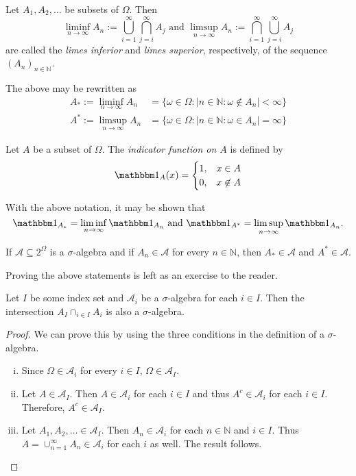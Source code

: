 \begin{definition}
\label{defLimes}
    Let $A_1,A_2,\ldots$ be subsets of $\Omega$. Then
    $$\liminf_{n\to\infty}A_n:=\bigcup_{i=1}^\infty\bigcap_{j=i}^\infty A_j\text{ and }\limsup_{n\to\infty}A_n:=\bigcap_{i=1}^\infty\bigcup_{j=i}^\infty A_j$$
    are called the \textit{limes inferior} and \textit{limes superior}, respectively, of the sequence $(A_n)_{n\in\mathbb{N}}$.
\end{definition}

The above may be rewritten as
\begin{align*}
    A_*:=\liminf_{n\to\infty}A_n &= \{\omega\in\Omega : |n\in\mathbb{N}:\omega\not\in A_n|<\infty\} \\
    A^*:=\limsup_{n\to\infty}A_n &= \{\omega\in\Omega : |n\in\mathbb{N}:\omega\in A_n|=\infty\}
\end{align*}

\begin{definition}
    Let $A$ be a subset of $\Omega$. The \textit{indicator function on $A$} is defined by
    $$\indic_A(x)
    =
    \begin{cases}
    1, & x\in A \\
    0, & x\not\in A
    \end{cases}
    $$
\end{definition}

With the above notation, it may be shown that
$$\indic_{A_*}=\liminf_{n\to\infty}\indic_{A_n}\text{ and }\indic_{A^*}=\limsup_{n\to\infty}\indic_{A_n}.$$

If $\mathcal{A}\subseteq2^\Omega$ is a $\sigma$-algebra and if $A_n\in\mathcal{A}$ for every $n\in\mathbb{N}$, then $A_*\in\mathcal{A}$ and $A^*\in\mathcal{A}$.

Proving the above statements is left as an exercise to the reader.

\begin{theorem}
\label{capofSigmaAisSigmaA}
    Let $I$ be some index set and $\mathcal{A}_i$ be a $\sigma$-algebra for each $i\in I$. Then the intersection $A_I\displaystyle\cap_{i\in I}A_i$ is also a $\sigma$-algebra.
\end{theorem}
\begin{proof}
    We can prove this by using the three conditions in the definition of a $\sigma$-algebra.
    \begin{enumerate}[(i)]
        \item Since $\Omega\in \mathcal{A}_i$ for every $i\in I$, $\Omega\in \mathcal{A}_I$.
        \item Let $A\in \mathcal{A}_I$. Then $A\in \mathcal{A}_i$ for each $i\in I$ and thus $A^c\in \mathcal{A}_i$ for each $i\in I$. Therefore, $A^c\in \mathcal{A}_I$.
        \item Let $A_1,A_2,\ldots\in \mathcal{A}_I$. Then $A_n\in\mathcal{A}_i$ for each $n\in\mathbb{N}$ and $i\in I$. Thus $A=\cup_{n=1}^\infty A_n\in\mathcal{A}_i$ for each $i$ as well. The result follows.
    \end{enumerate}
\end{proof}

